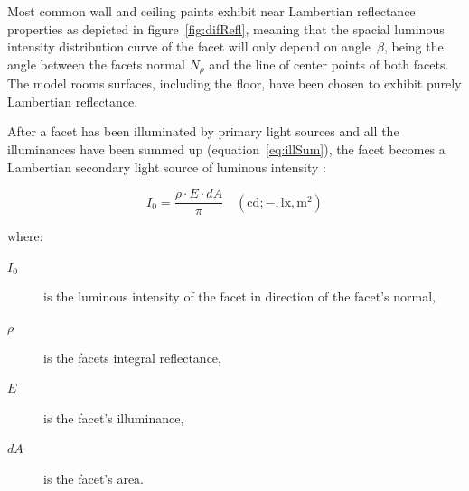 Most common wall and ceiling paints exhibit near Lambertian reflectance properties as depicted in figure~\ref{fig:difRefl}, meaning that the spacial luminous intensity distribution curve of the facet will only depend on angle~$\beta$, being the angle between the facets normal $N_{\rho}$ and the line of center points of both facets. The model rooms surfaces, including the floor, have been chosen to exhibit purely Lambertian reflectance.

After a facet has been illuminated by primary light sources and all the illuminances have been summed up (equation~\ref{eq:illSum}), the facet becomes a Lambertian secondary light source of luminous intensity \cite{Habel}:

\begin{equation}
I_{0}=\frac{\rho \cdot E \cdot dA}{\pi} \quad \mathrm{(cd;-,lx,m^{2})}
\label{eq:lumInt}
\end{equation}

where:
\begin{description}
	\item[$I_{0}$] is the luminous intensity of the facet in direction of the facet's normal,
	\item[$\rho$] is the facets integral reflectance,
	\item[$E$] is the facet's illuminance,
	\item[$dA$] is the facet's area.
\end{description}




